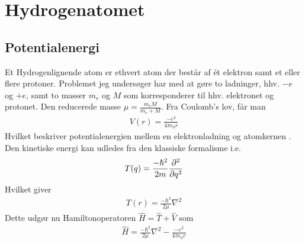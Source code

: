 \documentclass[12pt]{article}
\theoremstyle{definition}
\theoremstyle{remark}
\theoremstyle{definition}
\numberwithin{equation}{section}
\begin{document}
\section{Hydrogenatomet}
\subsection{Potentialenergi}
Et Hydrogenlignende atom er ethvert atom der består af ét elektron samt et eller flere protoner. Problemet jeg undersøger har med at gøre to ladninger, hhv. $-e$ og $+e$, samt to masser $m_e$ og $M$ som korresponderer til hhv. elektronet og protonet. Den reducerede masse $\mu = \frac{m_eM}{m_e+M}$. Fra Coulomb's lov, får man
\begin{align}
    V(r) = \frac{-e^2}{4\pi \epsilon_0 r}
\end{align}
Hvilket beskriver potentialenergien mellem en elektronladning og atomkernen \parencite{griffiths}. Den kinetiske energi kan udledes fra den klassiske formalisme i.e.
\begin{align}
    T(q) = \frac{-\hbar^2}{2m}\pdv[2]{q} 
\end{align}
Hvilket giver
\begin{align}
    T(r) = \frac{-\hbar^2}{2\mu}\nabla^2
\end{align}
Dette udgør nu Hamiltonoperatoren $\hat H = \hat T+\hat V$ som
\begin{align}
\label{hydrogenhamil}
    \hat H = \frac{-\hbar^2}{2\mu}\nabla^2 - \frac{-e^2}{4\pi \epsilon_0 r}
\end{align}
\end{document}
